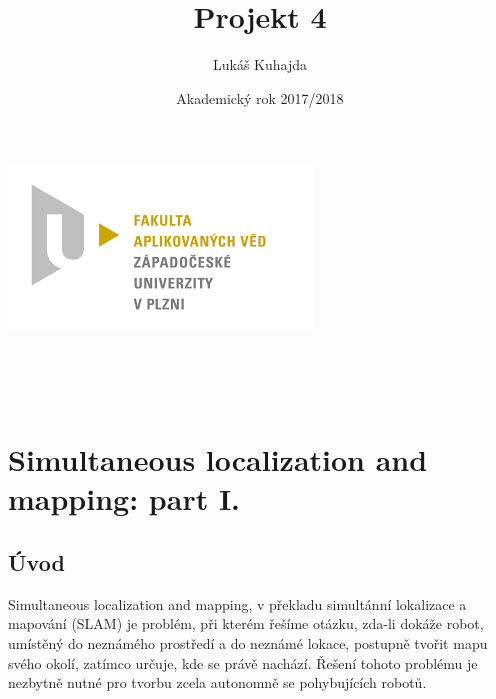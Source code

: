 \documentclass[11pt]{article}
\begin{document}
\title{Projekt 4}
\author{Lukáš Kuhajda}
\date{Akademický rok 2017/2018}
\begin{titlepage}
	\begin{center}
		\includegraphics[scale=0.5]{logo_zcu}\\
		\vspace{5cm}
		\begin{Large}
			\textbf{\thetitle}\\
		\end{Large}
		
		\vspace{3cm}
		\theauthor\\
		\vspace{5cm}
		\thedate
	\end{center}
\end{titlepage}
\newpage	
	
\tableofcontents
\newpage

\section{Simultaneous localization and mapping: part I.}
\subsection{Úvod}
Simultaneous localization and mapping, v překladu simultánní lokalizace a mapování (SLAM) je problém, při kterém řešíme otázku, zda-li dokáže robot, umístěný do neznámého prostředí a do neznámé lokace, postupně tvořit mapu svého okolí, zatímco určuje, kde se právě nachází. Řešení tohoto problému je nezbytně nutné pro tvorbu zcela autonomně se pohybujících robotů. \\
\end{document}
